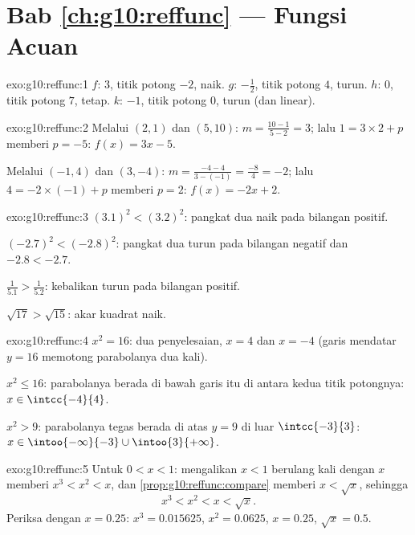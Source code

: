 \section*{Bab \ref{ch:g10:reffunc} --- Fungsi Acuan}

\begin{solution}{exo:g10:reffunc:1}
$f$:  $3$, titik potong $-2$, naik. \quad
$g$:  $-\frac12$, titik potong $4$, turun. \quad
$h$:  $0$, titik potong $7$, tetap. \quad
$k$:  $-1$, titik potong $0$, turun (dan linear).
\end{solution}

\begin{solution}{exo:g10:reffunc:2}
Melalui $(2,1)$ dan $(5,10)$:  $m = \frac{10 - 1}{5 - 2} = 3$; lalu
$1 = 3 \times 2 + p$ memberi $p = -5$: $f(x) = 3x - 5$.

Melalui $(-1,4)$ dan $(3,-4)$:  $m = \frac{-4 - 4}{3 - (-1)} =
\frac{-8}{4} = -2$; lalu $4 = -2 \times (-1) + p$ memberi $p = 2$:
$f(x) = -2x + 2$.
\end{solution}

\begin{solution}{exo:g10:reffunc:3}
$(3.1)^2 < (3.2)^2$: pangkat dua naik pada bilangan positif.

$(-2.7)^2 < (-2.8)^2$: pangkat dua turun pada bilangan negatif dan
$-2.8 < -2.7$.

$\frac{1}{5.1} > \frac{1}{5.2}$: kebalikan turun pada bilangan positif.

$\sqrt{17} > \sqrt{15}$: akar kuadrat naik.
\end{solution}

\begin{solution}{exo:g10:reffunc:4}
$x^2 = 16$: dua penyelesaian, $x = 4$ dan $x = -4$ (garis mendatar
$y = 16$ memotong parabolanya dua kali).

$x^2 \leq 16$: parabolanya berada di bawah garis itu di antara kedua
titik potongnya: $x \in \intcc{-4}{4}$.

$x^2 > 9$: parabolanya tegas berada di atas $y = 9$ di luar
$\intcc{-3}{3}$: $x \in \intoo{-\infty}{-3} \cup \intoo{3}{+\infty}$.
\end{solution}

\begin{solution}{exo:g10:reffunc:5}
Untuk $0 < x < 1$: mengalikan $x < 1$ berulang kali dengan $x$ memberi
$x^3 < x^2 < x$, dan \cref{prop:g10:reffunc:compare} memberi $x < \sqrt x$,
sehingga
\[
x^3 < x^2 < x < \sqrt x .
\]
Periksa dengan $x = 0.25$: $x^3 = 0.015625$, $x^2 = 0.0625$, $x = 0.25$,
$\sqrt x = 0.5$.
\end{solution}

